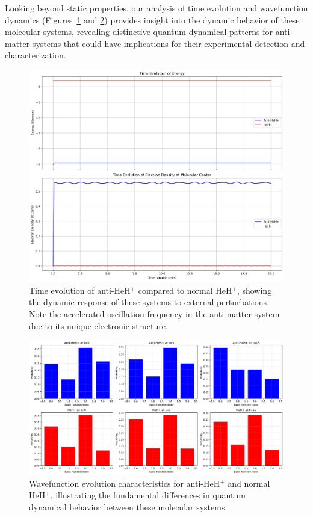 \documentclass[10pt,twocolumn,a4paper]{article}
\begin{document}
Looking beyond static properties, our analysis of time evolution and wavefunction dynamics (Figures~\ref{fig:time_evolution} and \ref{fig:wavefunction_evolution}) provides insight into the dynamic behavior of these molecular systems, revealing distinctive quantum dynamical patterns for anti-matter systems that could have implications for their experimental detection and characterization.

\begin{figure}[t!]
    \centering
    \includegraphics[width=\columnwidth]{graphs/corrected_time_evolution.png}
    \caption{Time evolution of anti-HeH$^+$ compared to normal HeH$^+$, showing the dynamic response of these systems to external perturbations. Note the accelerated oscillation frequency in the anti-matter system due to its unique electronic structure.}
    \label{fig:time_evolution}
\end{figure}

\begin{figure}[t!]
    \centering
    \includegraphics[width=\columnwidth]{graphs/corrected_wavefunction_evolution.png}
    \caption{Wavefunction evolution characteristics for anti-HeH$^+$ and normal HeH$^+$, illustrating the fundamental differences in quantum dynamical behavior between these molecular systems.}
    \label{fig:wavefunction_evolution}
\end{figure}
\end{document}
